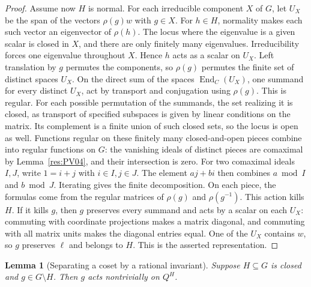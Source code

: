\documentclass[11pt,oneside,openany]{book}
\newtheorem{lemma}[theorem]{Lemma}
\theoremstyle{definition}
\theoremstyle{remark}
\begin{document}
\begin{proof}
Assume now \(H\) is normal. For each irreducible component
\(X\) of \(G\), let \(U_X\) be the span of the vectors
\(\rho(g)w\) with \(g\in X\). For \(h\in H\), normality
makes each such vector an eigenvector of \(\rho(h)\).
The locus where the eigenvalue is a given scalar is closed
in \(X\), and there are only finitely many eigenvalues.
Irreducibility forces one eigenvalue throughout \(X\).
Hence \(h\) acts as a scalar on \(U_X\).
Left translation by \(g\) permutes the components, so
\(\rho(g)\) permutes the finite set of distinct spaces \(U_X\).
On the direct sum of the spaces \(\operatorname{End}_C(U_X)\),
one summand for every distinct \(U_X\), act by transport and
conjugation using \(\rho(g)\). This is regular. For each possible
permutation of the summands, the set realizing it is
closed, as transport of specified subspaces is given by linear
conditions on the matrix. Its complement is a finite union of such
closed sets, so the locus is open as well. Functions regular on
these finitely many closed-and-open pieces combine into regular
functions on \(G\): the vanishing ideals of distinct pieces are
comaximal by Lemma~\ref{res:PV04}, and their intersection is zero.
For two comaximal ideals \(I,J\), write \(1=i+j\) with \(i\in I,j\in J\).
The element \(aj+bi\) then combines \(a\bmod I\) and \(b\bmod J\).
Iterating gives the finite decomposition.
On each piece, the formulas come from the regular matrices of
\(\rho(g)\) and \(\rho(g^{-1})\).
This action kills \(H\). If it kills \(g\), then \(g\)
preserves every summand and acts by a scalar on each \(U_X\):
commuting with coordinate projections makes a matrix diagonal,
and commuting with all matrix units makes the diagonal entries equal.
One of the \(U_X\) contains \(w\), so \(g\) preserves \(\ell\)
and belongs to \(H\). This is the asserted representation.
\end{proof}

\begin{lemma}[Separating a coset by a rational invariant]
\label{res:PV16}
Suppose \(H\subseteq G\) is closed and \(g\in G\setminus H\).
Then \(g\) acts nontrivially on \(Q^H\).
\end{lemma}
\end{document}
